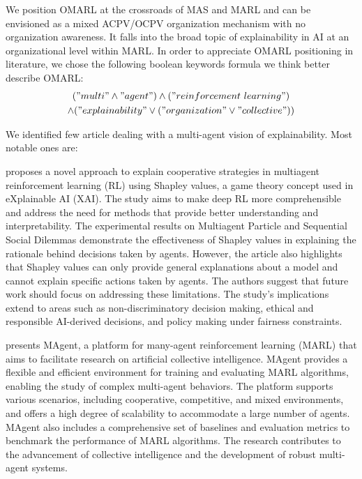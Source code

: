 \documentclass[runningheads]{llncs}
\begin{document}
We position OMARL at the crossroads of MAS and MARL and can be envisioned as a mixed ACPV/OCPV organization mechanism with no organization awareness. It falls into the broad topic of explainability in AI at an organizational level within MARL. In order to appreciate OMARL positioning in literature, we chose the following boolean keywords formula we think better describe OMARL:
\begin{gather*}
    ("multi" \land "agent") \land ("reinforcement \ learning")\\ \land ("explainability" \lor ("organization" \lor "collective"))
\end{gather*}

We identified few article dealing with a multi-agent vision of explainability. Most notable ones are:

\cite{Heuillet2022} proposes a novel approach to explain cooperative strategies in multiagent reinforcement learning (RL) using Shapley values, a game theory concept used in eXplainable AI (XAI). The study aims to make deep RL more comprehensible and address the need for methods that provide better understanding and interpretability. The experimental results on Multiagent Particle and Sequential Social Dilemmas demonstrate the effectiveness of Shapley values in explaining the rationale behind decisions taken by agents. However, the article also highlights that Shapley values can only provide general explanations about a model and cannot explain specific actions taken by agents. The authors suggest that future work should focus on addressing these limitations. The study's implications extend to areas such as non-discriminatory decision making, ethical and responsible AI-derived decisions, and policy making under fairness constraints.

\cite{Zheng2018} presents MAgent, a platform for many-agent reinforcement learning (MARL) that aims to facilitate research on artificial collective intelligence. MAgent provides a flexible and efficient environment for training and evaluating MARL algorithms, enabling the study of complex multi-agent behaviors. The platform supports various scenarios, including cooperative, competitive, and mixed environments, and offers a high degree of scalability to accommodate a large number of agents. MAgent also includes a comprehensive set of baselines and evaluation metrics to benchmark the performance of MARL algorithms. The research contributes to the advancement of collective intelligence and the development of robust multi-agent systems.
\end{document}
